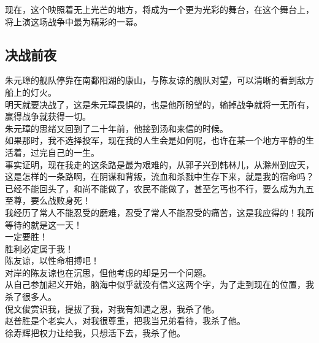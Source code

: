 \begin{multicols}{\theparacolNo}
现在，这个映照着无上光芒的地方，将成为一个更为光彩的舞台，在这个舞台上，将上演这场战争中最为精彩的一幕。\\

\subsection{决战前夜}
朱元璋的舰队停靠在南鄱阳湖的康山，与陈友谅的舰队对望，可以清晰的看到敌方船上的灯火。\\

明天就要决战了，这是朱元璋畏惧的，也是他所盼望的，输掉战争就将一无所有，赢得战争就获得一切。\\

朱元璋的思绪又回到了二十年前，他接到汤和来信的时候。\\

如果那时，我不选择投军，现在我的人生会是如何呢，也许在某一个地方平静的生活着，过完自己的一生。\\

事实证明，现在我走的这条路是最为艰难的，从郭子兴到韩林儿，从滁州到应天，这是怎样的一条路啊，在阴谋和背叛，流血和杀戮中生存下来，就是我的宿命吗？\\

已经不能回头了，和尚不能做了，农民不能做了，甚至乞丐也不行，要么成为九五至尊，要么战败身死！\\

我经历了常人不能忍受的磨难，忍受了常人不能忍受的痛苦，这是我应得的！我所等待的就是这一天！\\

一定要胜！\\

胜利必定属于我！\\

陈友谅，以性命相搏吧！\\

对岸的陈友谅也在沉思，但他考虑的却是另一个问题。\\

从自己参加起义开始，脑海中似乎就没有信义这两个字，为了走到现在的位置，我杀了很多人。\\

倪文俊赏识我，提拔了我，对我有知遇之恩，我杀了他。\\

赵普胜是个老实人，对我很尊重，把我当兄弟看待，我杀了他。\\

徐寿辉把权力让给我，只想活下去，我杀了他。\\


\end{multicols}
